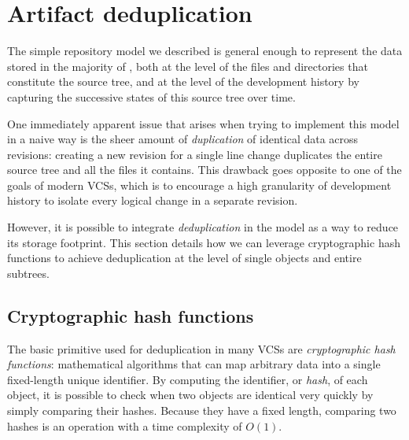 \section{Artifact deduplication}

The simple repository model we described is general enough to represent the
data stored in the majority of , both at the level of the files
and directories that constitute the source tree, and at the level of the
development history by capturing the successive states of this source tree over
time.

One immediately apparent issue that arises when trying to implement this model
in a naive way is the sheer amount of \emph{duplication} of identical data
across revisions: creating a new revision for a single line change duplicates
the entire source tree and all the files it contains. This drawback goes
opposite to one of the goals of modern \glspl{VCS}, which is to encourage a
high granularity of development history to isolate every logical change in a
separate revision.

However, it is possible to integrate \emph{deduplication} in the model as a way
to reduce its storage footprint. This section details how we can leverage
cryptographic hash functions to achieve deduplication at the level of single
objects and entire subtrees.

\subsection{Cryptographic hash functions}

The basic primitive used for deduplication in many \glspl{VCS} are
\emph{cryptographic hash functions}: mathematical algorithms that can map
arbitrary data into a single fixed-length unique identifier. By computing the
identifier, or \emph{hash}, of each object, it is possible to check when two
objects are identical very quickly by simply comparing their hashes. Because
they have a fixed length, comparing two hashes is an operation with a time
complexity of $O(1)$.

